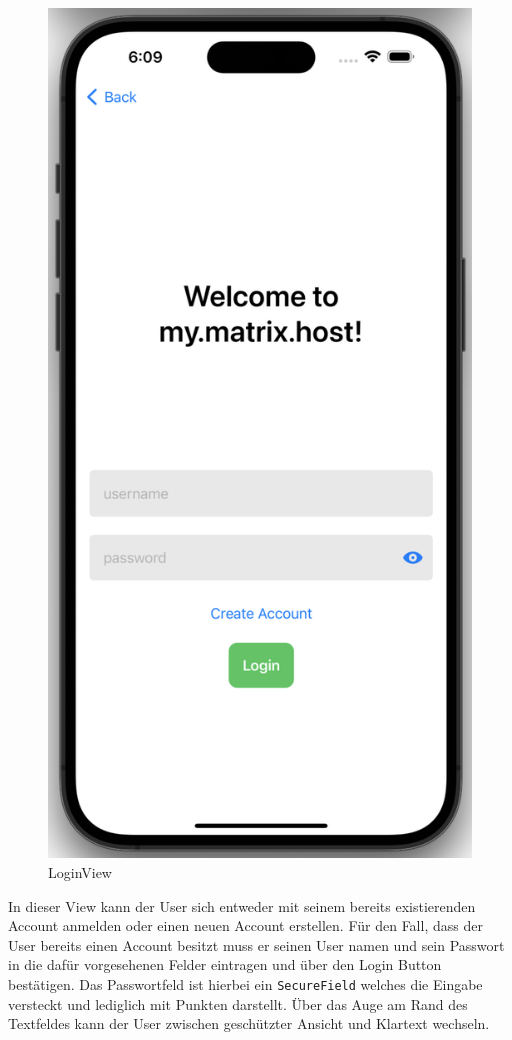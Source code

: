     \begin{figure}[h]
        \includegraphics[scale=0.5]{login}
        \centering
        \caption{LoginView}\label{fig:loginview}
    \end{figure}
    In dieser View kann der User sich entweder mit seinem bereits existierenden Account anmelden oder einen neuen Account erstellen.
    Für den Fall, dass der User bereits einen Account besitzt muss er seinen User namen und sein Passwort in die dafür vorgesehenen Felder eintragen und über den Login Button bestätigen.
    Das Passwortfeld ist hierbei ein \texttt{SecureField} welches die Eingabe versteckt und lediglich mit Punkten darstellt.
    Über das Auge am Rand des Textfeldes kann der User zwischen geschützter Ansicht und Klartext wechseln.


